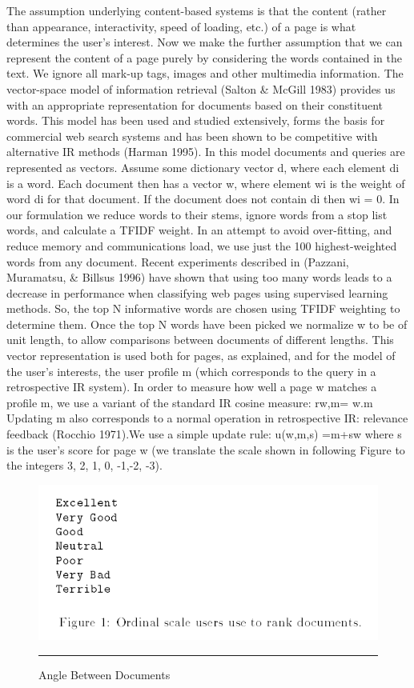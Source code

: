 The assumption underlying content-based systems is that the content (rather than appearance, interactivity, speed of loading, etc.) of a page is what determines the user's interest. Now we make the further assumption that we can represent the content of a page purely by considering the words contained in the text. We ignore all mark-up tags, images and other multimedia information.
The vector-space model of information retrieval (Salton & McGill 1983) provides us with an appropriate representation for documents based on their constituent words. This model has been used and studied extensively, forms the basis for commercial web search systems and has been shown to be competitive with alternative IR methods (Harman 1995).
In this model documents and queries are represented as vectors. Assume some dictionary vector d, where each element di is a word. Each document then has a vector w, where element wi is the weight of word di for that document. If the document does not contain di then wi = 0.
In our formulation we reduce words to their stems, ignore words from a stop list words, and calculate a TFIDF weight.
In an attempt to avoid over-fitting, and reduce memory and communications load, we use just the 100 highest-weighted words from any document. Recent experiments described in (Pazzani, Muramatsu, & Billsus 1996) have shown that using too many words leads to a decrease in performance when classifying web pages using supervised learning methods. So, the top N informative words are chosen using TFIDF weighting to determine them.
Once the top N words have been picked we normalize w to be of unit length, to allow comparisons between documents of different lengths.
This vector representation is used both for pages, as explained, and for the model of the user's interests, the user profile m (which corresponds to the query in a retrospective IR system). In order to measure how well a page w matches a profile m, we use a variant of the standard IR cosine measure:
rw,m= w.m
Updating m also corresponds to a normal operation in retrospective IR: relevance feedback (Rocchio 1971).We use a simple update rule:
u(w,m,s) =m+sw
where s is the user's score for page w (we translate the scale shown in following Figure to the integers 3, 2, 1, 0, -1,-2, -3).
\begin{figure}[htbp]
	\centering
		\includegraphics{./Figures/Capture2.PNG}
		\rule{35em}{0.5pt}
	\caption[Angle Between Documents]{Angle Between Documents}
	\label{fig:Angle Between Documents}
\end{figure}
